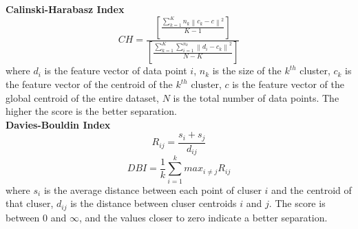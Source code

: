 \documentclass[journal,article,submit,pdftex,moreauthors]{Definitions/mdpi}
\begin{document}
\textbf{Calinski-Harabasz Index}
    \begin{equation}
        CH=\frac{\left[\frac{\sum_{k=1}^{K} n_{k}\left\|c_{k}-c\right\|^{2}}{K-1}\right]}{\left[\frac{\sum_{k=1}^{K} \sum_{i=1}^{n_{k}}\left\|d_{i}-c_{k}\right\|^{2}}{N-K}\right]}
    \end{equation}
    where $d_i$ is the feature vector of data point $i$, $n_k$ is the size of the $k^{th}$ cluster, $c_k$ is the feature vector of the centroid of the $k^{th}$ cluster, $c$ is the feature vector of the global centroid of the entire dataset, $N$ is the total number of data points. The higher the score is the better separation.\\

\textbf{Davies-Bouldin Index}
    \begin{equation}
        R_{ij} = \frac{s_{i} + s_{j}}{d_{ij}}
    \end{equation}
    \begin{equation}
        DBI = \frac{1}{k} \sum_{i=1}^{k} max_{i \neq j} R_{ij}
    \end{equation}
    where $s_{i}$ is the average distance between each point of cluser $i$ and the centroid of that cluser, $d_{ij}$ is the distance between cluser centroids $i$ and $j$. The score is between $0$ and $\infty$, and the values closer to zero indicate a better separation.\\



\end{document}
